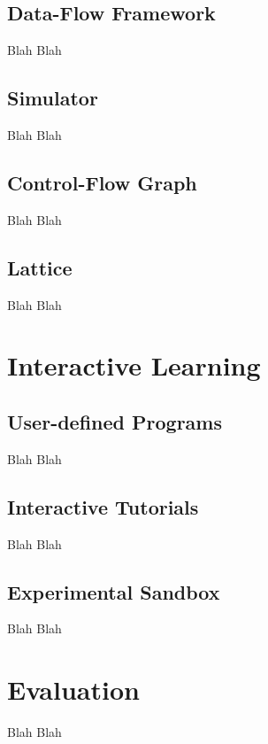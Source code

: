 \documentclass[bsc,twoside,singlespacing,parskip,logo,notimes,normalheadings]{infthesis}
\begin{document}
    \section{Data-Flow Framework}
    Blah Blah
    
    \section{Simulator}
    Blah Blah
    
    \section{Control-Flow Graph}
    Blah Blah
    
    \section{Lattice}
    Blah Blah
    

\chapter{Interactive Learning}\label{chap:impl-teaching}

    \section{User-defined Programs}
    Blah Blah
    
    \section{Interactive Tutorials}
    Blah Blah
    
    \section{Experimental Sandbox}
    Blah Blah
    

\chapter{Evaluation}
Blah Blah



\end{document}
